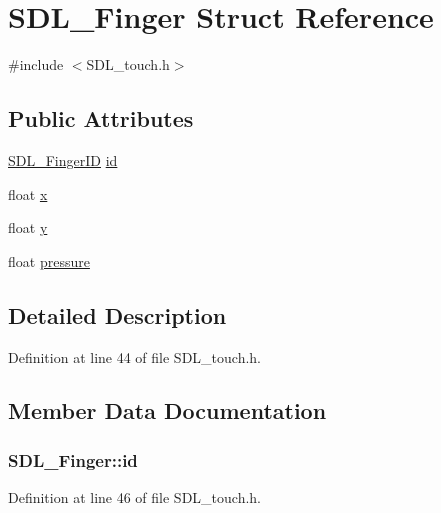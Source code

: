 \hypertarget{struct_s_d_l___finger}{\section{S\-D\-L\-\_\-\-Finger Struct Reference}
\label{struct_s_d_l___finger}
}


{\ttfamily \#include $<$S\-D\-L\-\_\-touch.\-h$>$}

\subsection*{Public Attributes}
\begin{DoxyCompactItemize}
\item 
\hyperlink{_s_d_l__touch_8h_a5fa58141f78415ca09645af359ad2250}{S\-D\-L\-\_\-\-Finger\-I\-D} \hyperlink{struct_s_d_l___finger_a3cec630146eeec5bd6299a9387a6f16a}{id}
\item 
float \hyperlink{struct_s_d_l___finger_ab91dfbd03c3215560457fef44e1c7755}{x}
\item 
float \hyperlink{struct_s_d_l___finger_a0a2c7a06ae641940111e03801c672cf9}{y}
\item 
float \hyperlink{struct_s_d_l___finger_a0ecb50c7fd699d59899ac60c941bdee6}{pressure}
\end{DoxyCompactItemize}


\subsection{Detailed Description}


Definition at line 44 of file S\-D\-L\-\_\-touch.\-h.



\subsection{Member Data Documentation}
\hypertarget{struct_s_d_l___finger_a3cec630146eeec5bd6299a9387a6f16a}{
\subsubsection[{id}]{ S\-D\-L\-\_\-\-Finger\-::id}}\label{struct_s_d_l___finger_a3cec630146eeec5bd6299a9387a6f16a}


Definition at line 46 of file S\-D\-L\-\_\-touch.\-h.


